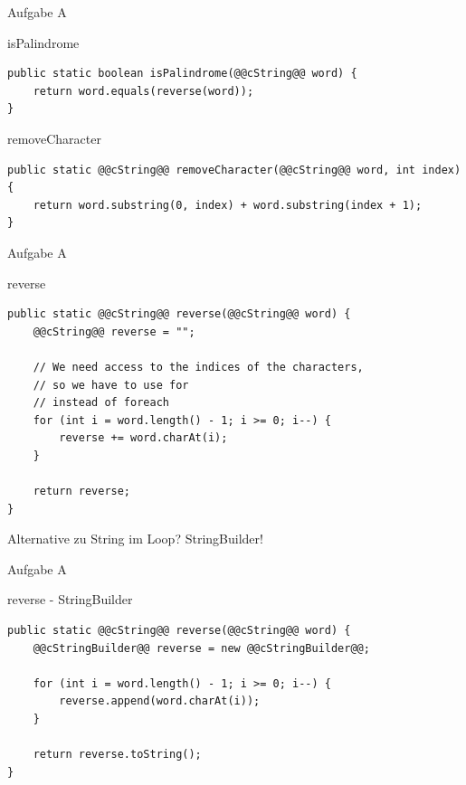 \documentclass[aspectratio=169]{beamer}
\begin{document}
\begin{frame}[fragile]{Aufgabe A}
  \begin{block}{isPalindrome}
    \begin{lstlisting}
public static boolean isPalindrome(@@cString@@ word) {
    return word.equals(reverse(word));
}
    \end{lstlisting}
  \end{block}
  \pause
  \begin{block}{removeCharacter}
    \begin{lstlisting}
public static @@cString@@ removeCharacter(@@cString@@ word, int index) {
    return word.substring(0, index) + word.substring(index + 1);
}
    \end{lstlisting}
  \end{block}
\end{frame}

\begin{frame}[fragile]{Aufgabe A}
  \begin{block}{reverse}
    \begin{lstlisting}
public static @@cString@@ reverse(@@cString@@ word) {
    @@cString@@ reverse = "";

    // We need access to the indices of the characters,
    // so we have to use for
    // instead of foreach
    for (int i = word.length() - 1; i >= 0; i--) {
        reverse += word.charAt(i);
    }

    return reverse;
}
    \end{lstlisting}
  \end{block}
  \pause
  Alternative zu \color{classcolor}String \color{FGround} im Loop? \pause \color{classcolor}StringBuilder\color{FGround}!
\end{frame}

\begin{frame}[fragile]{Aufgabe A}
  \begin{exampleblock}{reverse - StringBuilder}
    \begin{lstlisting}
public static @@cString@@ reverse(@@cString@@ word) {
    @@cStringBuilder@@ reverse = new @@cStringBuilder@@;

    for (int i = word.length() - 1; i >= 0; i--) {
        reverse.append(word.charAt(i));
    }

    return reverse.toString();
}
    \end{lstlisting}
  \end{exampleblock}
\end{frame}
\end{document}
